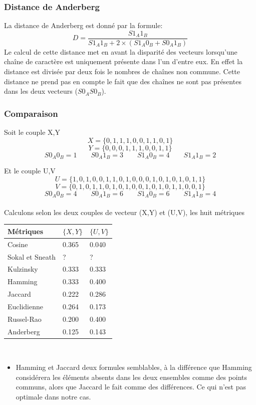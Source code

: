 \documentclass[a4paper, 12pt, twoside]{article}
\begin{document}
\subsubsection{Distance de Anderberg}
La distance de Anderberg est donné par la formule:
\begin{equation}
   D = \frac{S1_{A}1_{B}}{S1_{A}1_{B} + 2\times(S1_{A}0_{B}+S0_{A}1_{B})}
\end{equation}
Le calcul de cette distance met en avant la disparité des vecteurs lorsqu'une chaîne de caractère est uniquement présente dans l'un d'entre eux. En effet la distance est divisée par deux fois le nombres de chaînes non commune. Cette distance ne prend pas en compte le fait que des chaînes ne sont pas présentes dans les deux vecteurs ($S0_{A}S0_{B}$).

\subsubsection{Comparaison}


Soit le couple X,Y
\[
   X = \{0,1,1,1,0,0,1,1,0,1\}
\]
\[
  Y = \{0,0,0,1,1,1,0,0,1,1\} 
\]
\[
S0_{A}0_{B}=1 \qquad
S0_{A}1_{B}=3 \qquad
S1_{A}0_{B}=4 \qquad
S1_{A}1_{B}=2
\]

Et le couple U,V
\[
   U = \{1,0,1,0,0,1,1,0,1,0,0,0,1,0,1,0,1,0,1,1\}
\]
\[
   V = \{0,1,0,1,1,0,1,0,1,0,0,1,0,1,0,1,1,0,0,1\}
\]
\[
S0_{A}0_{B}=4  \qquad
S0_{A}1_{B}=6  \qquad
S1_{A}0_{B}=6  \qquad
S1_{A}1_{B}=4
\]
\\
Calculons selon les deux couples de vecteur (X,Y) et (U,V), les huit métriques

\begin{center}
\begin{tabular}{|l|l|l|}
    \hline
   Métriques & $\{X,Y\}$ & $\{U,V\}$\\
   \hline
   Cosine & 0.365 & 0.040\\
   \hline
   Sokal et Sneath & ? & ?\\
   \hline
   Kulzinsky & 0.333 & 0.333\\
   \hline
   Hamming & 0.333 & 0.400\\
   \hline
   Jaccard & 0.222 & 0.286\\
   \hline
   Euclidienne & 0.264 & 0.173\\
   \hline
   Russel-Rao & 0.200 & 0.400\\
   \hline
   Anderberg & 0.125 & 0.143\\
   \hline
\end{tabular}\\
\end{center}
\begin{itemize}
\item Hamming et Jaccard deux formules semblables, à la différence que Hamming considérera les éléments absents dans les deux ensembles comme des points communs, alors que Jaccard le fait comme des différences. Ce qui n'est pas optimale dans notre cas.

\end{itemize}
\end{document}
